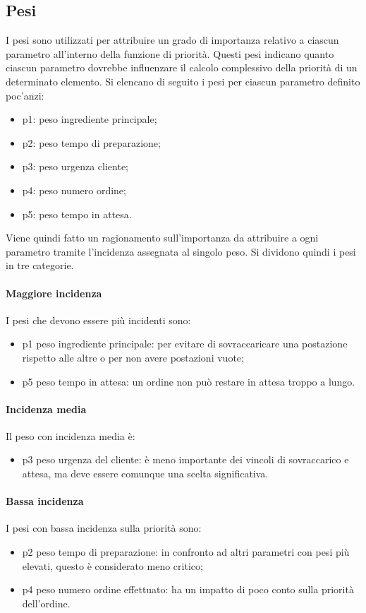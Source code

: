 \subsection*{Pesi}
I pesi sono utilizzati per attribuire un grado di importanza relativo a ciascun parametro all'interno della funzione di priorità. Questi pesi indicano quanto ciascun parametro dovrebbe influenzare il calcolo complessivo della priorità di un determinato elemento.
Si elencano di seguito i pesi per ciascun parametro definito poc’anzi:
\begin{itemize}
	\item p1: peso ingrediente principale;
	\item p2: peso tempo di preparazione;
	\item p3: peso urgenza cliente;
	\item p4: peso numero ordine;
	\item p5: peso tempo in attesa.
\end{itemize}

Viene quindi fatto un ragionamento sull’importanza da attribuire a ogni parametro tramite l’incidenza assegnata al singolo peso. Si dividono quindi i pesi in tre categorie.

\paragraph{Maggiore incidenza} I pesi che devono essere più incidenti sono:
\begin{itemize}
	\item p1 peso ingrediente principale: per evitare di sovraccaricare una postazione rispetto alle altre o per non avere postazioni vuote;
	\item p5 peso tempo in attesa: un ordine non può restare in attesa troppo a lungo.
\end{itemize}

\paragraph{Incidenza media} Il peso con incidenza media è:
\begin{itemize}
	\item p3 peso urgenza del cliente: è meno importante dei vincoli di sovraccarico e attesa, ma deve essere comunque una scelta significativa.
\end{itemize}

\paragraph{Bassa incidenza} I pesi con bassa incidenza sulla priorità sono:
\begin{itemize}
	\item p2 peso tempo di preparazione: in confronto ad altri parametri con pesi più elevati, questo è considerato meno critico;
	\item p4 peso numero ordine effettuato: ha un impatto di poco conto sulla priorità dell’ordine.
\end{itemize}

